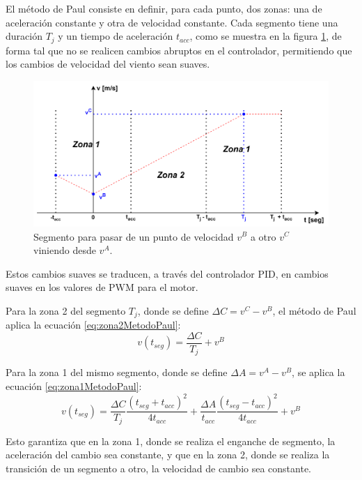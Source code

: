 El método de Paul consiste en definir, para cada punto, dos zonas: una de aceleración constante y otra de velocidad constante. Cada segmento tiene una duración $T_{j}$ y un tiempo de aceleración $t_{acc}$, como se muestra en la figura \ref{fig:segmentosZona1yZona2}, de forma tal que no se realicen cambios abruptos en el controlador, permitiendo que los cambios de velocidad del viento sean suaves.

\begin{figure}[H]
    \centering
    \includegraphics[width=0.9\linewidth]{Figuras/AplicacionWeb/backend/segmentoTrayect.png}
    \caption{Segmento para pasar de un punto de velocidad $v^B$ a otro $v^C$ viniendo desde $v^A$.}
    \label{fig:segmentosZona1yZona2}
\end{figure}

Estos cambios suaves se traducen, a través del controlador PID, en cambios suaves en los valores de PWM para el motor.

Para la zona 2 del segmento $T_{j}$, donde se define $\Delta C = v^C - v^B$, el método de Paul aplica la ecuación \ref{eq:zona2MetodoPaul}:
\begin{equation}
    v(t_{seg}) = \frac{\Delta C}{T_j} + v^B
    \label{eq:zona2MetodoPaul}
\end{equation}

Para la zona 1 del mismo segmento, donde se define $\Delta A = v^A - v^B$, se aplica la ecuación \ref{eq:zona1MetodoPaul}:
\begin{equation}
    v(t_{seg}) = \frac{\Delta C}{T_j} \frac{(t_{seg} + t_{acc})^2}{4t_{acc}} + \frac{\Delta A}{t_{acc}} \frac{(t_{seg} - t_{acc})^2}{4t_{acc}} + v^B 
    \label{eq:zona1MetodoPaul}
\end{equation}

Esto garantiza que en la zona 1, donde se realiza el enganche de segmento, la aceleración del cambio sea constante, y que en la zona 2, donde se realiza la transición de un segmento a otro, la velocidad de cambio sea constante.

